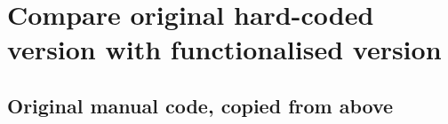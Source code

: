 \documentclass[
]{article}
\newenvironment{Shaded}{\begin{snugshade}}{\end{snugshade}}
\newcommand{\AttributeTok}[1]{\textcolor[rgb]{0.13,0.29,0.53}{#1}}
\newcommand{\ConstantTok}[1]{\textcolor[rgb]{0.56,0.35,0.01}{#1}}
\newcommand{\ControlFlowTok}[1]{\textcolor[rgb]{0.13,0.29,0.53}{\textbf{#1}}}
\newcommand{\FunctionTok}[1]{\textcolor[rgb]{0.13,0.29,0.53}{\textbf{#1}}}
\newcommand{\NormalTok}[1]{#1}
\newcommand{\OtherTok}[1]{\textcolor[rgb]{0.56,0.35,0.01}{#1}}
\newcommand{\SpecialCharTok}[1]{\textcolor[rgb]{0.81,0.36,0.00}{\textbf{#1}}}
\newcommand{\StringTok}[1]{\textcolor[rgb]{0.31,0.60,0.02}{#1}}
\begin{document}
\begin{Shaded}
\end{Shaded}

\hypertarget{compare-original-hard-coded-version-with-functionalised-version}{%
\section{Compare original hard-coded version with functionalised
version}\label{compare-original-hard-coded-version-with-functionalised-version}}

\hypertarget{original-manual-code-copied-from-above}{%
\subsection{Original manual code, copied from
above}\label{original-manual-code-copied-from-above}}
\end{document}
